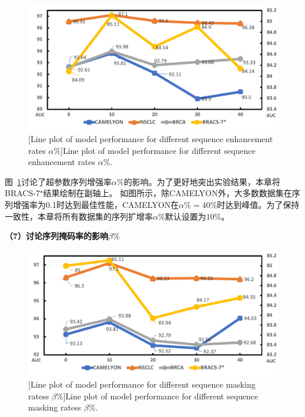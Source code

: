 \begin{figure}[h!]
  \centering
  \includegraphics[width=0.8\columnwidth]{figures/MixRatio.pdf}
  [Line plot of model performance for different sequence enhancement rates \texorpdfstring{$\alpha\%$}{}]{Line plot of model performance for different sequence enhancement rates \texorpdfstring{$\alpha\%$}{}.}
  \label{figure4: mixratio}
\end{figure}

图~\ref{figure4: mixratio}讨论了超参数序列增强率$\alpha\%$的影响。为了更好地突出实验结果，本章将BRACS-7$^\star$结果绘制在副轴上。
如图所示，除CAMELYON外，大多数数据集在序列增强率为0.1时达到最佳性能，CAMELYON在$\alpha\%=40\%$时达到峰值。为了保持一致性，本章将所有数据集的序列扩增率$\alpha\%$默认设置为$10\%$。


\textbf{（7）讨论序列掩码率的影响\texorpdfstring{$\beta\%$}{}}

\begin{figure}[h!]
  \centering
  \includegraphics[width=0.8\columnwidth]{figures/MaskRatio.pdf}
  [Line plot of model performance for different sequence masking ratess \texorpdfstring{$\beta\%$}{}]{Line plot of model performance for different sequence masking ratess \texorpdfstring{$\beta\%$}{}.}
  \label{figure4: maskratio}
\end{figure}

